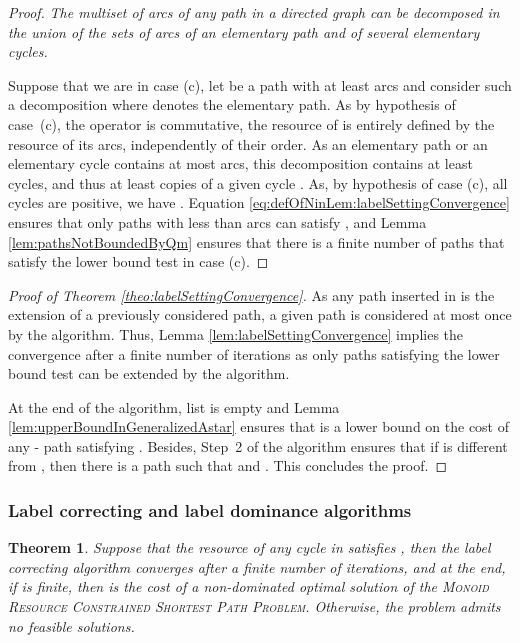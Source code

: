 \documentclass[11pt]{amsart}
\theoremstyle{plain}
\newtheorem{theo}{Theorem}
\theoremstyle{remark}
\newcommand{\MRCSP}{\textsc{Monoid Resource Constrained Shortest Path Problem}\xspace}
\begin{document}
\begin{proof}
{\em The multiset of arcs of any path in a directed graph can be decomposed in the union of the sets of arcs of an elementary path and of several elementary cycles. }

Suppose that we are in case (c), let  be a path with at least  arcs and consider such a decomposition where  denotes the elementary path. As by hypothesis of case~(c), the operator  is commutative, the resource of  is entirely defined by the resource of its arcs, independently of their order. As an elementary path or an elementary cycle contains at most  arcs, this decomposition contains at least  cycles, and thus at least  copies of a given cycle . As, by hypothesis of case (c), all cycles are positive, we have . Equation \ref{eq:defOfNinLem:labelSettingConvergence} ensures that only paths with less than  arcs can satisfy , and Lemma \ref{lem:pathsNotBoundedByQm} ensures that there is a finite number of paths that satisfy the lower bound test in case (c).  
\end{proof}


\begin{proof}[Proof of Theorem \ref{theo:labelSettingConvergence}] As any path inserted in  is the extension of a previously considered path, a given path is considered at most once by the algorithm. Thus, Lemma \ref{lem:labelSettingConvergence} implies the convergence after a finite number of iterations as only paths satisfying the lower bound test can be extended by the algorithm.

At the end of the algorithm, list  is empty and Lemma \ref{lem:upperBoundInGeneralizedAstar} ensures that  is a lower bound on the cost of any - path satisfying . Besides, Step~2 of the algorithm ensures that if  is different from , then there is a path  such that  and . This concludes the proof.
\end{proof}

\subsubsection{Label correcting and label dominance algorithms} \label{ssub:label_correcting_algorithm}

\begin{theo}\label{theo:labelCorrectingConvergence}
Suppose that the resource of any cycle  in  satisfies , then the label correcting algorithm converges after a finite number of iterations, and at the end, if   is finite, then   is the cost of a non-dominated optimal solution of the \MRCSP. Otherwise, the problem admits no feasible solutions.
\end{theo}
\end{document}
